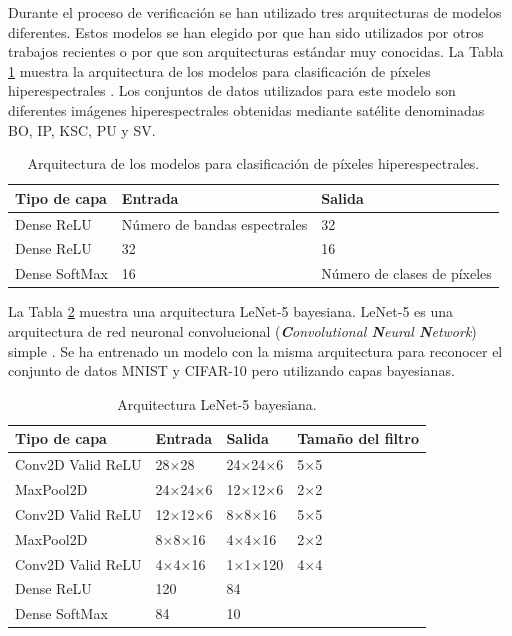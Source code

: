 Durante el proceso de verificación se han utilizado tres arquitecturas de modelos diferentes. Estos modelos se han elegido por que han sido utilizados por otros trabajos recientes o por que son arquitecturas estándar muy conocidas. La Tabla \ref{tab:hyper_models} muestra la arquitectura de los modelos para clasificación de píxeles hiperespectrales \cite{bnn_hyper_uncertainty}. Los conjuntos de datos utilizados para este modelo son diferentes imágenes hiperespectrales obtenidas mediante satélite denominadas BO, IP, KSC, PU y SV.


\begin{table}[h]
	\centering
	\caption{Arquitectura de los modelos para clasificación de píxeles hiperespectrales.}
	\label{tab:hyper_models}
	\begin{tabular}{lll}
	\hline
     	\textbf{Tipo de capa} & \textbf{Entrada} & \textbf{Salida}\\ \hline
     	Dense ReLU& Número de bandas espectrales & 32\\
     	Dense ReLU& 32 & 16\\
     	Dense SoftMax& 16 & Número de clases de píxeles\\ \hline
	\end{tabular}
\end{table}

La Tabla \ref{tab:cnn_models} muestra una arquitectura LeNet-5 bayesiana. LeNet-5 es una arquitectura de red neuronal convolucional (\textit{\textbf{C}onvolutional \textbf{N}eural \textbf{N}etwork}) simple \cite{lenet}. Se ha entrenado un modelo con la misma arquitectura para reconocer el conjunto de datos MNIST \cite{MNIST_dataset} y CIFAR-10 \cite{CIFAR_dataset} pero utilizando capas bayesianas.

\begin{table}[h]
	\centering
	\caption{Arquitectura LeNet-5 bayesiana.}
	\label{tab:cnn_models}
	\begin{tabular}{llll}
    	\hline
     	\textbf{Tipo de capa} &  \textbf{Entrada} &  \textbf{Salida} & \textbf{Tamaño del filtro} \\ \hline
     	Conv2D Valid ReLU& 28$\times$28 & 24$\times$24$\times$6 & 5$\times$5 \\
     	MaxPool2D & 24$\times$24$\times$6 & 12$\times$12$\times$6 & 2$\times$2 \\
     	Conv2D Valid  ReLU& 12$\times$12$\times$6 & 8$\times$8$\times$16 & 5$\times$5 \\
     	MaxPool2D & 8$\times$8$\times$16 & 4$\times$4$\times$16 & 2$\times$2 \\
     	Conv2D Valid  ReLU& 4$\times$4$\times$16 & 1$\times$1$\times$120 & 4$\times$4 \\
     	Dense ReLU& 120 & 84 & \\
     	Dense SoftMax& 84 & 10 & \\ \hline
	\end{tabular}
\end{table}

